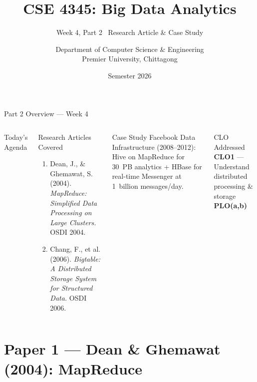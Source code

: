 \documentclass[aspectratio=169,10pt]{beamer}
\title[CSE 4345 \textbar{} Week 4, Part 2]{CSE 4345: Big Data Analytics}
\subtitle{Week 4, Part 2 \textemdash\ Research Article \& Case Study}
\author[Dept.\ of CSE]{Department of Computer Science \& Engineering\\[4pt]
       \small Premier University, Chittagong}
\institute{}
\date{Semester 2026}
\begin{document}

\begin{frame}
  \titlepage
\end{frame}

\begin{frame}{Part 2 Overview — Week 4}
  \begin{columns}[T]
      \begin{block}{Today's Agenda}
        \tableofcontents
      \end{block}

      \begin{exampleblock}{Research Articles Covered}
        \begin{enumerate}
          \item Dean, J., \& Ghemawat, S. (2004).
                \textit{MapReduce: Simplified Data Processing
                on Large Clusters.} OSDI 2004.
          \item Chang, F., et al. (2006).
                \textit{Bigtable: A Distributed Storage System
                for Structured Data.} OSDI 2006.
        \end{enumerate}
      \end{exampleblock}
      \vspace{6pt}
      \begin{alertblock}{Case Study}
        Facebook Data Infrastructure (2008--2012):
        Hive on MapReduce for 30~PB analytics
        + HBase for real-time Messenger at 1~billion messages/day.
      \end{alertblock}
      \vspace{4pt}
      \begin{block}{CLO Addressed}
        \textbf{CLO1} — Understand distributed processing \& storage\\
        \textbf{PLO(a,b)}
      \end{block}
  \end{columns}
\end{frame}

\section{Paper 1 — Dean \& Ghemawat (2004): MapReduce}
\end{document}
